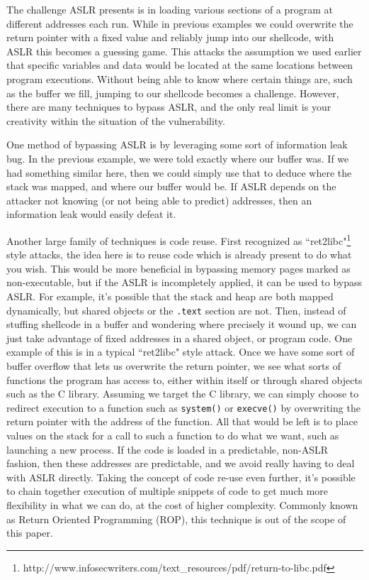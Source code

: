 The challenge ASLR presents is in loading various sections of a 
program at different addresses each run. While in previous examples
we could overwrite the return pointer with a fixed value and reliably
jump into our shellcode, with ASLR this becomes a guessing game.
This attacks the assumption we used earlier that specific variables
and data would be located at the same locations between program
executions. Without being able to know where certain things are, 
such as the buffer we fill, jumping to our shellcode becomes a
challenge. However, there are many techniques to bypass
ASLR, and the only real limit is your creativity within the
situation of the vulnerability.

One method of bypassing ASLR is by leveraging some sort of
information leak bug. In the previous example, we were told
exactly where our buffer was. If we had something similar here, 
then we could simply use that to deduce where the stack was
mapped, and where our buffer would be. If ASLR depends on the 
attacker not knowing (or not being able to predict) addresses, 
then an information leak would easily defeat it.

Another large family of techniques is code reuse. First recognized
as ``ret2libc"\footnote{http://www.infosecwriters.com/text\_resources/pdf/return-to-libc.pdf}
style attacks, the idea here is to reuse code
which is already present to do what you wish. This would be 
more beneficial in bypassing memory pages marked as non-executable,
but if the ASLR is incompletely applied, it can be used to bypass
ASLR. For example, it's possible that the stack and heap are both
mapped dynamically, but shared objects or the \texttt{.text} section are not.
Then, instead of stuffing shellcode in a buffer and wondering where
precisely it wound up, we can just take advantage of fixed
addresses in a shared object, or program code. One example of this
is in a typical ``ret2libc" style attack. Once we have some
sort of buffer overflow that lets us overwrite the return pointer,
we see what sorts of functions the program has access to, either
within itself or through shared objects such as the C library.
Assuming we target the C library, we can simply choose to redirect
execution to a function such as \texttt{system()} or \texttt{execve()}
by overwriting the return pointer with the address of the function.
All that would be left is to place values on the stack 
for a call to such a function to do what we want, such as
launching a new process. If the code is loaded in a predictable, 
non-ASLR fashion, then these addresses are predictable, and
we avoid really having to deal with ASLR directly. Taking the concept
of code re-use even further, it's possible to chain together
execution of multiple snippets of code to get much more flexibility
in what we can do, at the cost of higher complexity. Commonly known
as Return Oriented Programming (ROP), this technique is out of the 
scope of this paper.

